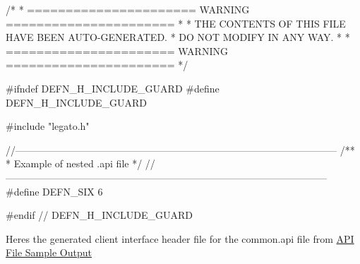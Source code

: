 \begin{DoxyVerbInclude}
/*
 * ====================== WARNING ======================
 *
 * THE CONTENTS OF THIS FILE HAVE BEEN AUTO-GENERATED.
 * DO NOT MODIFY IN ANY WAY.
 *
 * ====================== WARNING ======================
 */


#ifndef DEFN_H_INCLUDE_GUARD
#define DEFN_H_INCLUDE_GUARD


#include "legato.h"


//--------------------------------------------------------------------------------------------------
/**
 * Example of nested .api file
 */
//--------------------------------------------------------------------------------------------------
#define DEFN_SIX 6


#endif // DEFN_H_INCLUDE_GUARD

\end{DoxyVerbInclude}


Here\textquotesingle{}s the generated client interface header file for the common.\+api file from \hyperlink{interface_def_lang_c_interfaceDefLangC_sampleAPI}{A\+P\+I File Sample Output}


